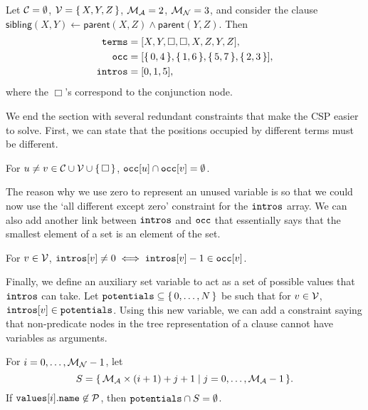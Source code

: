 \begin{example}\label{example:sibling}
  Let $\mathcal{C}{} = \emptyset$, $\mathcal{V}{} = \{\, X, Y, Z \,\}$,
  $\mathcal{M}_{\mathcal{A}}{} = 2$, $\mathcal{M}_{\mathcal{N}}{} = 3$, and consider the clause
  $\mathsf{sibling}(X, Y) \gets \mathsf{parent}(X, Z) \land \mathsf{parent}(Y, Z)$.
  Then
  \begin{align*}
    \texttt{\textup{terms}} &= [X, Y, \Box, \Box, X, Z, Y, Z], \\
    \texttt{\textup{occ}} &= [\{\, 0, 4 \,\}, \{\, 1, 6 \,\}, \{\, 5, 7 \,\}, \{\, 2, 3 \,\}], \\
    \texttt{\textup{intros}} &= [0, 1, 5],
  \end{align*}
  where the $\Box$'s correspond to the conjunction node.
\end{example}

We end the section with several redundant constraints that make the CSP easier
to solve. First, we can state that the positions occupied by different terms
must be different.
\begin{constraint} \label{constraint:all_diff}
  For $u \ne v \in \mathcal{C}{} \cup \mathcal{V}{} \cup \{\, \Box \,\}$,
  $\texttt{\textup{occ}}[u] \cap \texttt{\textup{occ}}[v] = \emptyset$.
\end{constraint}
The reason why we use zero to represent an unused variable is so that we could
now use the `all different except zero' constraint for the $\texttt{\textup{intros}}$
array. We can also add another link between $\texttt{\textup{intros}}$ and
$\texttt{\textup{occ}}$ that essentially says that the smallest element of a set is an
element of the set.
\begin{constraint}
  For $v \in \mathcal{V}{}$, $\texttt{\textup{intros}}[v] \ne 0 \iff
  \texttt{\textup{intros}}[v] - 1 \in \texttt{\textup{occ}}[v]$.
\end{constraint}
Finally, we define an auxiliary set variable to act as a set of possible values
that $\texttt{\textup{intros}}$ can take. Let
$\texttt{\textup{potentials}} \subseteq \{\, 0, \dots, N \,\}$ be such that for
$v \in \mathcal{V}{}$, $\texttt{\textup{intros}}[v] \in \texttt{\textup{potentials}}$. Using
this new variable, we can add a constraint saying that non-predicate nodes in
the tree representation of a clause cannot have variables as arguments.
\begin{constraint} \label{constraint:potentialIntroductions}
  For $i = 0, \dots, \mathcal{M}_{\mathcal{N}}{} - 1$, let
  \[
    S = \{\, \mathcal{M}_{\mathcal{A}}{} \times (i + 1) + j + 1 \mid j = 0, \dots, \mathcal{M}_{\mathcal{A}}{} - 1 \,\}.
  \]
  If $\texttt{\textup{values}}[i].\texttt{\textup{name}} \not\in \mathcal{P}{}$, then
  $\texttt{\textup{potentials}} \cap S = \emptyset$.
\end{constraint}

